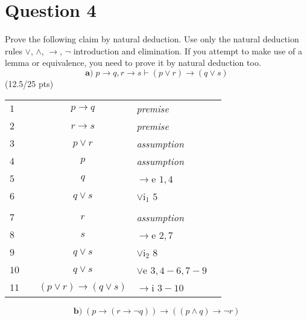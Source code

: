 \documentclass[a4paper,12pt]{article}
\newcommand\tab[1][1cm]{\hspace*{#1}}
\begin{document}
	\section*{Question 4 \hfill {}}
	\tab Prove the following claim by natural deduction. Use only the natural deduction rules $\vee$, $\wedge$, $\rightarrow$, $\neg$ introduction and elimination. If you attempt to make use of a lemma or equivalence, you need to prove it by natural deduction too.
	\begin{equation*}
	\textbf{a)} \; p \rightarrow q, r \rightarrow s \vdash (p \vee r) \rightarrow (q \vee s)
	\end{equation*}
	\hfill \small{(12.5/25 pts)}\\
	\begin{tcolorbox}
		\begin{table}[H]
			\centering
			\begin{tabular}{llcll}
				\hline 
				\hline
				$1$ & & $p\rightarrow q$& \textit{premise} & \\
				$2$ & & $r\rightarrow s$& \textit{premise} & \\
				\cline{2-5}
				$3$ &\multicolumn{1}{|c}{} & $p\lor r$& \textit{assumption} &\multicolumn{1}{c|}{} \\
				\cline{3-4}
				$4$ &\multicolumn{1}{|c}{} & \multicolumn{1}{|c}{$p$} & \multicolumn{1}{l|}{\textit{assumption}} &\multicolumn{1}{c|}{} \\
				$5$ &\multicolumn{1}{|c}{} & \multicolumn{1}{|c}{$q$} & \multicolumn{1}{l|}{$\rightarrow$e $1,4$} &\multicolumn{1}{c|}{} \\
				$6$ &\multicolumn{1}{|c}{} & \multicolumn{1}{|c}{$q\lor s$} & \multicolumn{1}{l|}{$\lor$i$_1$ $5$} &\multicolumn{1}{c|}{} \\
				\cline{3-4}
				&\multicolumn{1}{|c}{} & & &\multicolumn{1}{c|}{}\\
				\cline{3-4}
				$7$ &\multicolumn{1}{|c}{} & \multicolumn{1}{|c}{$r$} & \multicolumn{1}{l|}{\textit{assumption}} &\multicolumn{1}{c|}{} \\
				$8$ &\multicolumn{1}{|c}{} & \multicolumn{1}{|c}{$s$} & \multicolumn{1}{l|}{$\rightarrow$e $2,7$} &\multicolumn{1}{c|}{} \\
				$9$ &\multicolumn{1}{|c}{} & \multicolumn{1}{|c}{$q\lor s$} & \multicolumn{1}{l|}{$\lor$i$_2$ $8$} &\multicolumn{1}{c|}{} \\ \cline{3-4}
				$10$ &\multicolumn{1}{|c}{} & $q\lor s$& $\lor$e $3,4-6,7-9$ &\multicolumn{1}{c|}{} \\ \cline{2-5}
				$11$ & & $(p\lor r)\rightarrow(q\lor s)$ & $\rightarrow$i $3-10$ & \\
			\end{tabular}
		\end{table}
	\end{tcolorbox}
	\begin{equation*}
	\textbf{b)} \;  (p \rightarrow (r \rightarrow \neg q)) \rightarrow ((p \wedge q) \rightarrow \neg r)
	\end{equation*}
	
\end{document}
